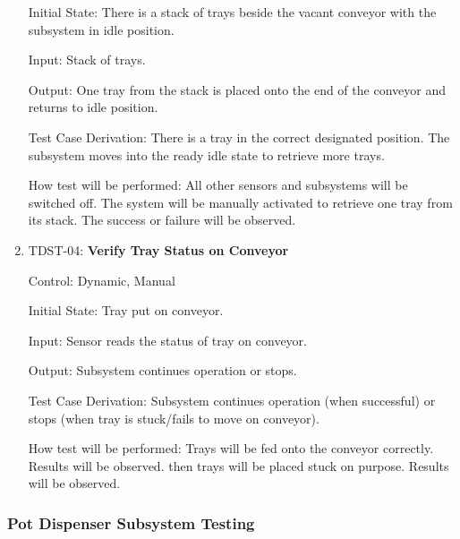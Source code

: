 \documentclass[12pt, titlepage]{article}
\begin{document}
\begin{enumerate}
  Initial State: There is a stack of trays beside the vacant conveyor with the subsystem in idle position.
            
  Input: Stack of trays.
            
  Output: One tray from the stack is placed onto the end of the conveyor and returns to idle position.
  
  Test Case Derivation: There is a tray in the correct designated position.
  The subsystem moves into the ready idle state to retrieve more trays.
            
  How test will be performed: All other sensors and subsystems will be switched off. 
  The system will be manually activated to retrieve one tray from its stack.
  The success or failure will be observed.
\\
  \item{TDST-04: \textbf{Verify Tray Status on Conveyor}}
  
  Control: Dynamic, Manual
            
  Initial State: Tray put on conveyor.
            
  Input: Sensor reads the status of tray on conveyor.
            
  Output: Subsystem continues operation or stops.
  
  Test Case Derivation: Subsystem continues operation (when successful) or stops (when tray is stuck/fails to move on conveyor).
  
  How test will be performed: Trays will be fed onto the conveyor correctly. Results will be observed.
  then trays will be placed stuck on purpose. Results will be observed.
  
  \end{enumerate}

\subsubsection{Pot Dispenser Subsystem Testing}
\end{document}

